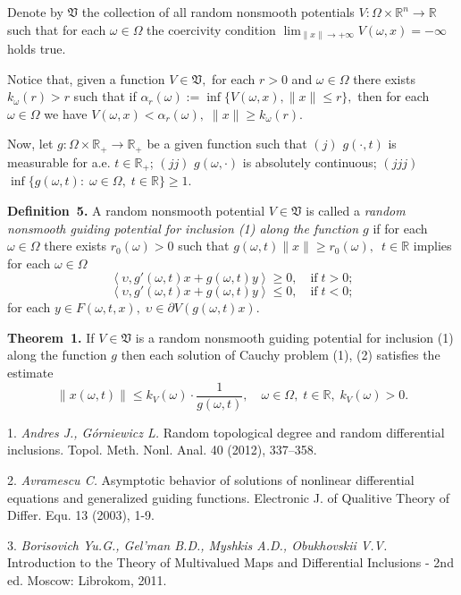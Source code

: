 \noindent Denote by $\mathfrak{V}$ the collection of all random nonsmooth potentials $V: \Omega\times\mathbb{R}^n \to \mathbb{R}$ such that for each $\omega\in\Omega$ the coercivity condition
$
\lim_{\|x\|\to +\infty} V(\omega,x) = -\infty
$
holds true.

Notice that, given a function $V \in \mathfrak{V},$ for each $r>0$ and $\omega\in\Omega$ there exists $k_\omega(r) > r$ such that
if
$
\alpha_r(\omega):=\inf\{V(\omega,x),$\linebreak$\|x\|\leq r\},
$
then for each $\omega\in\Omega$ we have
$
 V(\omega,x)< \alpha_r(\omega), \;\|x\|\geq k_\omega(r).
$

Now, let $g:\Omega\times\mathbb{R}_+\to \mathbb{R}_+$ be a given function such that
$(j)$ $g(\cdot, t)$ is measurable for a.e. $t\in\mathbb{R}_+$;
$(jj)$ $g(\omega, \cdot)$ is absolutely continuous;
$(jjj)$ $\inf \{g(\omega,t):\; \omega\in\Omega,\; t\in \mathbb{R}\}\geq 1$.

\textbf{Definition~5.} A random nonsmooth potential $V \in \mathfrak{V}$ is called a {\it random nonsmooth guiding potential for inclusion (1) along the function $g$} if for each $\omega\in\Omega$ there exists $r_0(\omega)>0$ such that $g(\omega,t)\|x\|\ge r_0(\omega),$ \,$t \in \mathbb{R}$ implies for each $\omega\in\Omega$
$$
\left< {\upsilon,g'(\omega,t)x+g(\omega,t)y} \right> \geq 0, \quad \mbox {if} \; t>0;
$$
$$
\left< {\upsilon,g'(\omega,t)x+g(\omega,t)y} \right> \leq 0, \quad \mbox {if}\; t<0;
$$
for each $y\in F(\omega,t,x), \; \upsilon \in \partial V(g(\omega,t)x).$

\textbf{Theorem~1.}
If $V \in \mathfrak{V}$ is a random nonsmooth guiding potential for inclusion (1) along the function $g$
then each solution of Cauchy problem (1), (2) satisfies the estimate
$$
\|x(\omega,t)\|\leq k_V(\omega)\cdot \frac{1}{g(\omega,t)},\quad \omega\in\Omega,\;t\in \mathbb{R}, \; k_V(\omega)>0.
$$

\litlist

1. {\it Andres J., G\'orniewicz L.} Random topological degree and random differential inclusions. Topol. Meth. Nonl. Anal. 40 (2012), 337--358.

2. {\it Avramescu C.} Asymptotic behavior of solutions of nonli\-near differential equations and generalized guiding functions. Elec\-tronic J. of Qualitive Theory of Differ. Equ. 13 (2003), 1-9.

3. {\it Borisovich Yu.G., Gel'man B.D., Myshkis A.D., Obukho\-vskii V.V.} Introduction to the Theory of Multivalued Maps and Dif\-fe\-ren\-tial Inclusions - 2nd ed. Moscow: Librokom, 2011.

